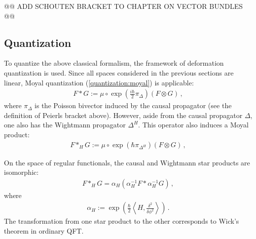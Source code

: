     @@ ADD SCHOUTEN BRACKET TO CHAPTER ON VECTOR BUNDLES @@

\subsection{Quantization}

    To quantize the above classical formalism, the framework of deformation quantization is used. Since all spaces considered in the previous sections are linear, Moyal quantization (\cref{quantization:moyal}) is applicable:
    \begin{gather}
        F\ast G := \mu\circ\exp(\tfrac{i\hbar}{2}\pi_\Delta)(F\otimes G)\,,
    \end{gather}
    where $\pi_\Delta$ is the Poisson bivector induced by the causal propagator (see the definition of Peierls bracket above). However, aside from the causal propagator $\Delta$, one also has the Wightmann propagator $\Delta^H$. This operator also induces a Moyal product:
    \begin{gather}
        \label{aqft:moyal_product}
        F\ast_HG := \mu\circ\exp(\hbar\pi_{\Delta^H})(F\otimes G)\,,
    \end{gather}

    \begin{property}
        On the space of regular functionals, the causal and Wightmann star products are isomorphic:
        \begin{gather}
            F\ast_HG = \alpha_H(\alpha_H^{-1}F\ast\alpha_H^{-1}G)\,,
        \end{gather}
        where
        \begin{gather}
            \alpha_H := \exp\left(\frac{\hbar}{2}\left\langle H,\frac{\delta^2}{\delta\phi^2}\right\rangle\right)\,.
        \end{gather}
        The transformation from one star product to the other corresponds to Wick's theorem in ordinary QFT.
    \end{property}

